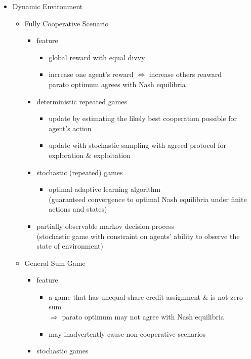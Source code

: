 \begin{itemize}
\item Dynamic Environment
	\begin{itemize}
	\item Fully Cooperative Scenario
		\begin{itemize}
		\item feature
			\begin{itemize}
			\item global reward with equal divvy
			\item increase one agent's reward $\Leftrightarrow$ increase others reaward \\
			parato optimum agrees with Nash equilibria
			\end{itemize}
		\item deterministic repeated games
			\begin{itemize}
			\item update by estimating the likely best cooperation possible for agent's action
			\item update with stochastic sampling with agreed protocol for exploration \& exploitation
			\end{itemize}
		\item stochastic (repeated) games
			\begin{itemize}
			\item optimal adaptive learning algorithm \\
			(guaranteed convergence to optimal Nash equilibria under finite actions and states)
			\end{itemize}
		\item partially observable markov decision process \\
		(stochastic game with constraint on agents' ability to observe the state of environment)
		\end{itemize}
	\item General Sum Game
		\begin{itemize}
		\item feature
			\begin{itemize}
			\item a game that has unequal-share credit assignment \& is not zero-sum \\
			$\Rightarrow$ parato optimum may not agree with Nash equilibria
			\item may inadvertently cause non-cooperative scenarios
			\end{itemize}
		\item stochastic games \\
			\begin{itemize}

\end{itemize}
\end{itemize}
\end{itemize}
\end{itemize}
